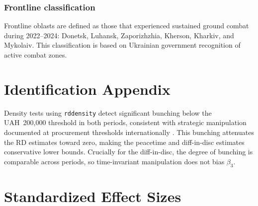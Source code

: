 \documentclass[12pt]{article}
\begin{document}
\subsubsection*{Frontline classification} Frontline oblasts are defined as those that experienced sustained ground combat during 2022--2024: Donetsk, Luhansk, Zaporizhzhia, Kherson, Kharkiv, and Mykolaiv. This classification is based on Ukrainian government recognition of active combat zones.

\section{Identification Appendix}
\label{sec:id_appendix}

Density tests using \texttt{rddensity} \citep{Cattaneo2020density} detect significant bunching below the UAH~200,000 threshold in both periods, consistent with strategic manipulation documented at procurement thresholds internationally \citep{Palguta2017}. This bunching attenuates the RD estimates toward zero, making the peacetime and diff-in-disc estimates conservative lower bounds. Crucially for the diff-in-disc, the degree of bunching is comparable across periods, so time-invariant manipulation does not bias $\beta_3$.

\section{Standardized Effect Sizes}
\label{sec:sde}


\end{document}
